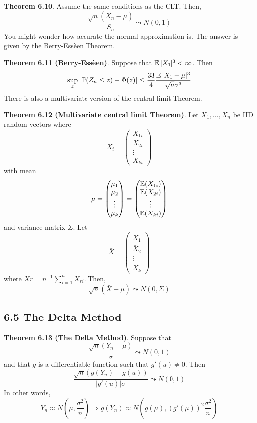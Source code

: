 \textbf{Theorem 6.10}. Assume the same conditions as the CLT. Then,
\[
\frac{\sqrt{n} \left(\bar{X}_{n} - \mu \right)}{S_{n}} \leadsto N(0, 1)
\]
You might wonder how accurate the normal approximation is. The answer is
given by the Berry-Essèen Theorem.

\textbf{Theorem 6.11 (Berry-Essèen)}. Suppose that
\(\operatorname{\mathbb{E}}|X_{1}|^{3} < \infty\). Then
\[
\sup _z |\operatorname{\mathbb{P}}(Z_{n} \leq z) - \Phi(z)| \leq \frac{33}{4} \frac{\operatorname{\mathbb{E}}|X_{1} - \mu|^{3}}{\sqrt{n}\sigma^{3}}
\]
There is also a multivariate version of the central limit Theorem.

\textbf{Theorem 6.12 (Multivariate central limit Theorem)}. Let
\(X_{1}, \dots, X_{n}\) be IID random vectors where
\[
X_{i} = \begin{pmatrix} X_{1i} \\ X_{2i} \\ \vdots \\ X_{ki} \end{pmatrix}
\]
with mean
\[
\mu 
= \begin{pmatrix} \mu_{1} \\ \mu_{2} \\ \vdots \\ \mu_{k} \end{pmatrix} 
= \begin{pmatrix} \operatorname{\mathbb{E}}(X_{1i}) \\ \operatorname{\mathbb{E}}(X_{2i}) \\ \vdots \\ \operatorname{\mathbb{E}}(X_{ki}) \end{pmatrix}
\]
and variance matrix \(\Sigma\). Let
\[
\bar{X} = \begin{pmatrix} \bar{X}_{1} \\ \bar{X}_{2} \\ \vdots \\ \bar{X}_{k} \end{pmatrix}
\]
where $\bar{X} r = n^{-1} \sum_{i=1}^{n} X_{ri}
$. Then,
\[
\sqrt{n} (\bar{X} - \mu) \leadsto N(0, \Sigma)
\]

\subsection*{6.5 The Delta Method}\label{delta:method}

\textbf{Theorem 6.13 (The Delta Method)}. Suppose that
\[
\frac{\sqrt{n}(Y_{n} - \mu)}{\sigma} \leadsto N(0, 1)
\]
and that \(g\) is a differentiable function such that \(g'(u) \neq 0\).
Then
\[
\frac{\sqrt{n}(g(Y_{n}) - g(u))}{|g'(u)| \sigma} \leadsto N(0, 1)
\]
In other words,
\[
Y_{n} \approx N \left( \mu, \frac{\sigma^{2}}{n} \right) \Rightarrow g(Y_{n}) \approx N \left( g(\mu), (g'(\mu))^{2} \frac{\sigma^{2}}{n} \right)
\]

